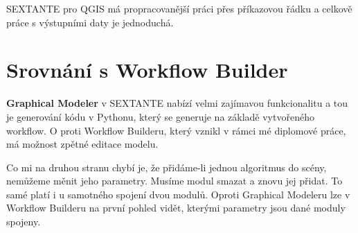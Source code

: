 SEXTANTE pro QGIS má propracovanější práci přes příkazovou řádku a celkově práce s výstupními daty je jednoduchá.

\section{Srovnání s Workflow Builder}

\textbf{Graphical Modeler} v SEXTANTE nabízí velmi zajímavou funkcionalitu a tou je generování kódu v Pythonu, který se generuje na základě vytvořeného workflow. O proti Workflow Builderu, který vznikl v rámci mé diplomové práce, má možnost zpětné editace modelu.

Co mi na druhou stranu chybí je, že přidáme-li jednou algoritmus do scény, nemůžeme měnit jeho parametry. Musíme modul smazat a znovu jej přidat. To samé platí i u samotného spojení dvou modulů. Oproti Graphical Modeleru lze v Workflow Builderu na první pohled vidět, kterými parametry jsou dané moduly spojeny. 